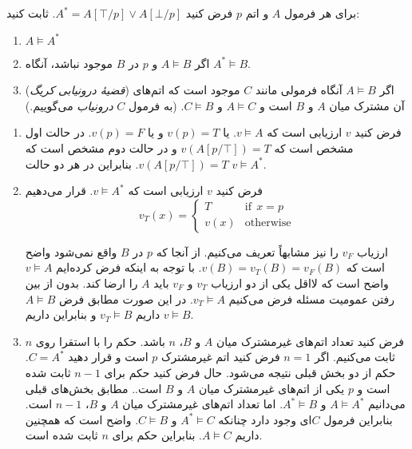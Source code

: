 برای هر فرمول $A$ و اتم $p$ فرض کنید
$A^*=A[\top/p]\vee A[\bot/p]$.
ثابت کنید:
\begin{enumerate}
\item
$A\models A^*$
\item
اگر
$A\models B$
و $p$ در $B$ موجود نباشد، آنگاه
$A^*\models B$.
\item
(\emph{قضیهٔ درونیابی کریگ})
اگر
$A\models B$
آنگاه فرمولی مانند $C$ موجود است که اتم‌های آن مشترک میان $A$ و $B$ است و $A\models C$ و $C\models B$.
(به فرمول $C$ \emph{درونیاب} می‌گوییم.)
\end{enumerate}\quad\vspace{-1cm}
\begin{ans}
  \begin{enumerate}
  \item
  فرض کنید $v$ ارزیابی است که $v\models A$. یا $v(p)=T$ و یا $v(p)=F$. در حالت اول مشخص است که
  $v(A[p/\top])=T$
  و در حالت دوم مشخص است که
  $v(A[p/\top])=T$.
  بنابراین در هر دو حالت
  $v\models A^*$.

  \item
  فرض کنید $v$ ارزیابی است که $v\models A^*$. قرار می‌دهیم
  $$
  v_T(x)=
  \begin{cases}
  T & \text{if}~~x=p\\
  v(x) & \text{otherwise}
  \end{cases}
  $$

  ارزیاب $v_F$ را نیز مشابهاً تعریف می‌کنیم. از آنجا که $p$ در $B$ واقع نمی‌شود واضح است که $v(B)=v_T(B)=v_F(B)$. با توجه به اینکه فرض کرده‌ایم $v\models A$ واضح است که لااقل یکی از دو ارزیاب $v_T$ و $v_F$ باید $A$ را ارضا کند. بدون از بین رفتن عمومیت مسئله فرض می‌کنیم $v_T\models A$. در این صورت مطابق فرض $A\models B$ داریم $v_T\models B$ و بنابراین داریم $v\models B$.

  \item
  فرض کنید تعداد اتم‌های غیرمشترک میان $A$ و $B$، $n$ باشد. حکم را با استقرا روی $n$ ثابت می‌کنیم. اگر $n=1$ فرض کنید اتم غیرمشترک $p$ است و قرار دهید $C=A^*$. حکم از دو بخش قبلی نتیجه می‌شود. حال فرض کنید حکم برای $n-1$ ثابت شده است و $p$ یکی از اتم‌های غیرمشترک میان $A$ و $B$ است.. مطابق بخش‌های قبلی می‌دانیم $A\models A^*$ و $A^*\models B$. اما تعداد اتم‌های غیرمشترک میان $A$ و $B$، $n-1$ است. بنابراین فرمول $C$ای وجود دارد چنانکه $A^*\models C$ و $C\models B$. واضح است که همچنین داریم $A\models C$. بنابراین حکم برای $n$ ثابت شده است.
  \end{enumerate}
\end{ans}